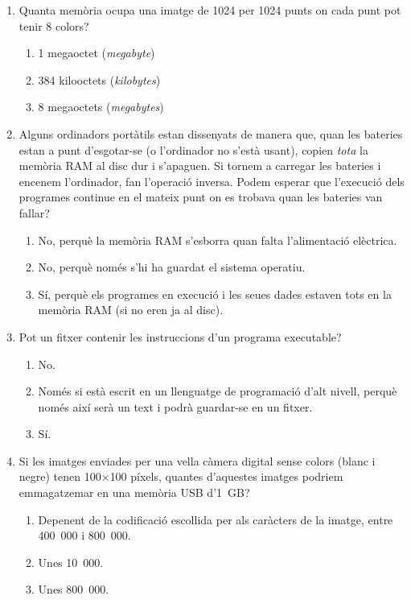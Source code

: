 \begin{enumerate}
\item 
   Quanta memòria ocupa una imatge de 1024 per 1024 punts on cada punt
   pot tenir 8 colors?
   
\begin{enumerate}
\item 1 megaoctet (\emph{megabyte})
\item 384 kilooctets (\emph{kilobytes})
\item 8 megaoctets (\emph{megabytes})
\end{enumerate}


\item Alguns ordinadors portàtils estan dissenyats de manera que, quan
  les bateries estan a punt d'esgotar-se (o l'ordinador no s'està
  usant), copien \emph{tota} la memòria RAM al disc dur i
  s'apaguen. Si tornem a carregar les bateries i encenem l'ordinador,
  fan l'operació inversa. Podem esperar que l'execució dels programes
  continue en el mateix punt on es trobava quan les bateries van
  fallar?
  
\begin{enumerate}
\item No, perquè la memòria RAM s'esborra quan falta l'alimentació
     elèctrica.
\item No, perquè només s'hi ha guardat el sistema operatiu.
\item Sí, perquè els programes en execució i les seues dades
     estaven tots en la memòria RAM (si no eren ja al disc).
\end{enumerate}

\item Pot un fitxer contenir les instruccions d'un programa executable?
\begin{enumerate}
\item No.
\item Només si està escrit en un llenguatge de programació d'alt nivell,
perquè només així serà un text i podrà guardar-se en un fitxer.
\item Sí.
\end{enumerate}
\item Si les imatges enviades per una vella càmera digital sense
  colors (blanc i negre) tenen 100$\times$100 píxels, quantes
  d'aquestes imatges podriem emmagatzemar en una memòria USB d'1~GB?
   
\begin{enumerate}
\item Depenent de la codificació escollida per als caràcters de la imatge, 
   entre 400~000 i 800~000.
\item Unes 10~000.
\item Unes 800~000.
\end{enumerate}


\end{enumerate}
